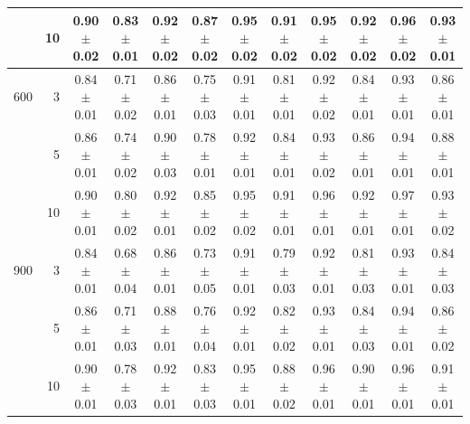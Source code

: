 \begin{table}[htbp]
\begin{tabular}{rrcccccccccc}
 & 10 & 0.90$\pm$0.02 & 0.83$\pm$0.01 & 0.92$\pm$0.02 & 0.87$\pm$0.02 & 0.95$\pm$0.02 & 0.91$\pm$0.02 & 0.95$\pm$0.02 & 0.92$\pm$0.02 & 0.96$\pm$0.02 & 0.93$\pm$0.01 \\
\midrule
600 & 3 & 0.84$\pm$0.01 & 0.71$\pm$0.02 & 0.86$\pm$0.01 & 0.75$\pm$0.03 & 0.91$\pm$0.01 & 0.81$\pm$0.01 & 0.92$\pm$0.02 & 0.84$\pm$0.01 & 0.93$\pm$0.01 & 0.86$\pm$0.01 \\
 & 5 & 0.86$\pm$0.01 & 0.74$\pm$0.02 & 0.90$\pm$0.03 & 0.78$\pm$0.01 & 0.92$\pm$0.01 & 0.84$\pm$0.01 & 0.93$\pm$0.02 & 0.86$\pm$0.01 & 0.94$\pm$0.01 & 0.88$\pm$0.01 \\
 & 10 & 0.90$\pm$0.01 & 0.80$\pm$0.02 & 0.92$\pm$0.01 & 0.85$\pm$0.02 & 0.95$\pm$0.02 & 0.91$\pm$0.01 & 0.96$\pm$0.01 & 0.92$\pm$0.01 & 0.97$\pm$0.01 & 0.93$\pm$0.02 \\
\midrule
900 & 3 & 0.84$\pm$0.01 & 0.68$\pm$0.04 & 0.86$\pm$0.01 & 0.73$\pm$0.05 & 0.91$\pm$0.01 & 0.79$\pm$0.03 & 0.92$\pm$0.01 & 0.81$\pm$0.03 & 0.93$\pm$0.01 & 0.84$\pm$0.03 \\
 & 5 & 0.86$\pm$0.01 & 0.71$\pm$0.03 & 0.88$\pm$0.01 & 0.76$\pm$0.04 & 0.92$\pm$0.01 & 0.82$\pm$0.02 & 0.93$\pm$0.01 & 0.84$\pm$0.03 & 0.94$\pm$0.01 & 0.86$\pm$0.02 \\
 & 10 & 0.90$\pm$0.01 & 0.78$\pm$0.03 & 0.92$\pm$0.01 & 0.83$\pm$0.03 & 0.95$\pm$0.01 & 0.88$\pm$0.02 & 0.96$\pm$0.01 & 0.90$\pm$0.01 & 0.96$\pm$0.01 & 0.91$\pm$0.01 \\
\bottomrule
\end{tabular}
\end{table}
